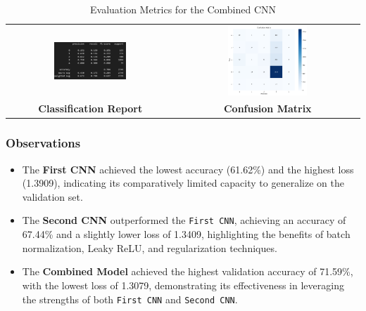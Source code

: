 \documentclass{article}
\begin{document}
\vspace{1cm}
\begin{table}[h!]
    \centering
    \begin{tabular}{cc}
        \includegraphics[width=0.45\textwidth]{CombinedCNN.png} &
        \includegraphics[width=0.45\textwidth]{combined_cnn_cf.png} \\
        \multicolumn{1}{c}{\textbf{Classification Report}} &
        \multicolumn{1}{c}{\textbf{Confusion Matrix}} \\
    \end{tabular}
    \caption{Evaluation Metrics for the Combined CNN}
    \label{tab:combined_cnn_metrics}
\end{table}

\newpage

\subsubsection{Observations}

\begin{itemize}
    \item The \textbf{First CNN} achieved the lowest accuracy (61.62\%) and the highest loss (1.3909), indicating its comparatively limited capacity to generalize on the validation set.
    \item The \textbf{Second CNN} outperformed the \texttt{First CNN}, achieving an accuracy of 67.44\% and a slightly lower loss of 1.3409, highlighting the benefits of batch normalization, Leaky ReLU, and regularization techniques.
    \item The \textbf{Combined Model} achieved the highest validation accuracy of 71.59\%, with the lowest loss of 1.3079, demonstrating its effectiveness in leveraging the strengths of both \texttt{First CNN} and \texttt{Second CNN}.
\end{itemize}
\end{document}
